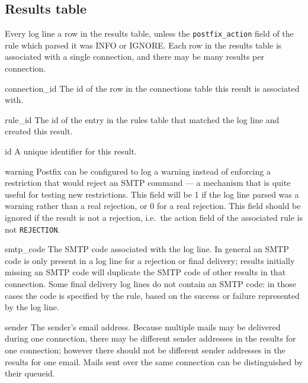 \subsection{Results table}

\label{results table}

Every log line a row in the results table, unless the
\texttt{postfix\_action} field of the rule which parsed it was INFO or
IGNORE\@.  Each row in the results table is associated with a single
connection, and there may be many results per connection.

\begin{eqlist}

    \item [connection\_id] The id of the row in the connections table this
        result is associated with.

    \item [rule\_id] The id of the entry in the rules table that matched
        the log line and created this result.

    \item [id] A unique identifier for this result.

    \item [warning] Postfix can be configured to log a warning instead of
        enforcing a restriction that would reject an \gls{SMTP} command ---
        a mechanism that is quite useful for testing new restrictions.
        This field will be 1 if the log line parsed was a warning rather
        than a real rejection, or 0 for a real rejection.  This field
        should be ignored if the result is not a rejection, i.e.\ the
        action field of the associated rule is not \texttt{REJECTION}.

    \item [smtp\_code] The \gls{SMTP} code associated with the log line.
        In general an \gls{SMTP} code is only present in a log line for a
        rejection or final delivery; results initially missing an
        \gls{SMTP} code will duplicate the \gls{SMTP} code of other results
        in that connection.  Some final delivery log lines do not contain
        an \gls{SMTP} code: in those cases the code is specified by the
        rule, based on the success or failure represented by the log line.

    \item [sender] The sender's email address.  Because multiple mails may
        be delivered during one connection, there may be different sender
        addresses in the results for one connection; however there should
        not be different sender addresses in the results for one email.
        Mails sent over the same connection can be distinguished by their
        queueid.


\end{eqlist}
